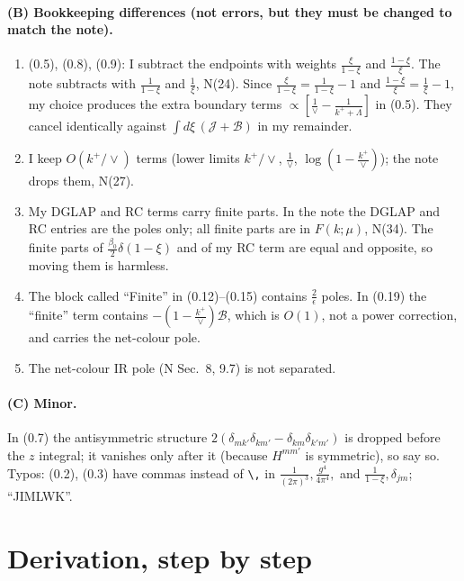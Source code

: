 \documentclass[10pt]{article}
\numberwithin{equation}{section}
\newcommand{\Jc}{\mathcal J}
\newcommand{\Bc}{\mathcal B}
\begin{document}
\paragraph{(B) Bookkeeping differences (not errors, but they must be changed to match the note).}
\begin{enumerate}
\item (0.5), (0.8), (0.9): I subtract the endpoints with weights $\frac{\xi}{1-\xi}$ and $\frac{1-\xi}{\xi}$. The note
subtracts with $\frac{1}{1-\xi}$ and $\frac1\xi$, N(24). Since $\frac{\xi}{1-\xi}=\frac{1}{1-\xi}-1$ and
$\frac{1-\xi}{\xi}=\frac1\xi-1$, my choice produces the extra boundary terms $\propto[\frac1\vee-\frac{1}{k^++\Lambda}]$ in (0.5).
They cancel identically against $\int d\xi\,(\Jc+\Bc)$ in my remainder.
\item I keep $O(k^+/\vee)$ terms (lower limits $k^+/\vee$, $\frac1\vee$, $\log(1-\frac{k^+}{\vee})$); the note drops them, N(27).
\item My DGLAP and RC terms carry finite parts. In the note the DGLAP and RC entries are the poles only; all
finite parts are in $F(k;\mu)$, N(34). The finite parts of $\frac{\beta_0}{2}\delta(1-\xi)$ and of my RC term are
equal and opposite, so moving them is harmless.
\item The block called ``Finite'' in (0.12)--(0.15) contains $\frac{2}{\epsilon}$ poles. In (0.19) the ``finite''
term contains $-(1-\frac{k^+}{\vee})\Bc$, which is $O(1)$, not a power correction, and carries the net-colour pole.
\item The net-colour IR pole (N Sec.~8, 9.7) is not separated.
\end{enumerate}

\paragraph{(C) Minor.} In (0.7) the antisymmetric structure $2(\delta_{mk'}\delta_{km'}-\delta_{km}\delta_{k'm'})$ is dropped
before the $z$ integral; it vanishes only after it (because $H^{mm'}$ is symmetric), so say so.
Typos: (0.2), (0.3) have commas instead of \verb|\,| in $\frac{1}{(2\pi)^3},\frac{g^4}{4\pi^4},$ and
$\frac{1}{1-\xi},\delta_{jm}$; ``JIMLWK''.

\section{Derivation, step by step}
\end{document}
